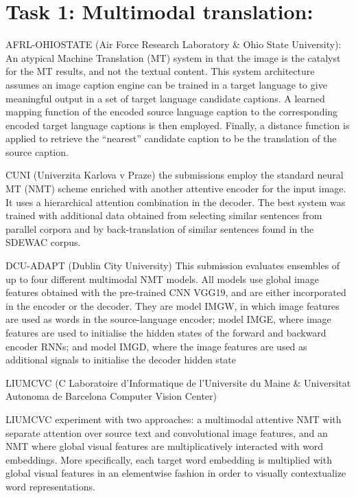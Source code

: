 \documentclass[presentation]{beamer}
\begin{document}
\section{Task 1: Multimodal translation:}
\label{sec:org0d8bf72}

\begin{frame}[label={sec:orgcbb3c23}]{AFRL-OHIOSTATE (Air Force Research Laboratory \& Ohio State University):}
An atypical Machine Translation (MT) system in that the image is the catalyst for the MT results, and not the textual content. This system architecture assumes an image caption engine can be trained in a target language to give meaningful output in a set of target language candidate captions. A learned mapping function of the encoded source language caption to the corresponding encoded target language captions is then employed. Finally, a distance function is applied to retrieve the “nearest” candidate caption to be the translation of the source caption.
\end{frame}


\begin{frame}[label={sec:orgf502f52}]{CUNI (Univerzita Karlova v Praze)}
the submissions employ the standard neural MT (NMT) scheme enriched with another attentive encoder for the input image. It uses a hierarchical attention combination in the decoder. The best system was trained with additional data obtained from selecting similar sentences from parallel corpora and by back-translation of similar sentences found in the SDEWAC corpus.
\end{frame}

\begin{frame}[label={sec:orge306116}]{DCU-ADAPT (Dublin City University)}
This submission evaluates ensembles of up to four different multimodal NMT models. All models use global image features obtained with the pre-trained CNN VGG19, and are either incorporated in the encoder or the decoder. They are model IMGW, in which image features are used as words in the source-language encoder; model IMGE, where image features are used to initialise the hidden states of the forward and backward encoder RNNs; and model IMGD, where the image features are used as additional signals to initialise the decoder hidden state

LIUMCVC (C Laboratoire d’Informatique de l’Universite du Maine \& Universitat Autonoma de Barcelona Computer Vision Center)

LIUMCVC experiment with two approaches: a multimodal attentive NMT with separate attention over source text and convolutional image features, and an NMT where global visual features are multiplicatively interacted with word embeddings. More specifically, each target word embedding is multiplied with global visual features in an elementwise fashion in order to visually contextualize word representations.
\end{frame}
\end{document}
